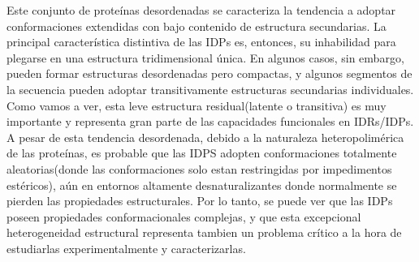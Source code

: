 

Este conjunto de proteínas desordenadas se caracteriza la tendencia a adoptar conformaciones extendidas con bajo contenido de estructura secundarias.
La principal característica distintiva de las IDPs es, entonces, su inhabilidad para plegarse en una estructura tridimensional única.
En algunos casos, sin embargo, pueden formar estructuras desordenadas pero compactas, y algunos segmentos de la secuencia pueden adoptar transitivamente estructuras secundarias individuales.
Como vamos a ver, esta leve estructura residual(latente o transitiva) es muy importante y representa gran parte de las capacidades funcionales en IDRs/IDPs.
A pesar de esta tendencia desordenada, debido a la naturaleza heteropolimérica de las proteínas, es probable que las IDPS adopten conformaciones totalmente aleatorias(donde las conformaciones solo estan restringidas por impedimentos estéricos),
aún en entornos altamente desnaturalizantes donde normalmente se pierden las propiedades estructurales.
Por lo tanto, se puede ver que las IDPs poseen propiedades conformacionales complejas, y que esta 
excepcional heterogeneidad estructural representa tambien un problema crítico a la hora de estudiarlas experimentalmente y caracterizarlas.









